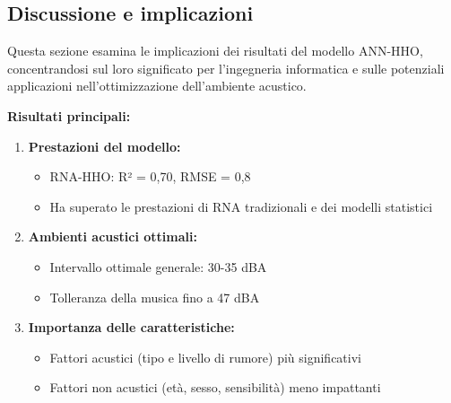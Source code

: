 \subsection{Discussione e implicazioni}
\noindent

Questa sezione esamina le implicazioni dei risultati del modello ANN-HHO, concentrandosi sul loro significato per l'ingegneria informatica e sulle potenziali applicazioni nell'ottimizzazione dell'ambiente acustico.

\textbf{Risultati principali:}
\begin{enumerate}
    \item \textbf{Prestazioni del modello:} 
    \begin{itemize}
        \item RNA-HHO: R² = 0,70, RMSE = 0,8
        \item Ha superato le prestazioni di RNA tradizionali e dei modelli statistici
    \end{itemize}
    \item \textbf{Ambienti acustici ottimali:} 
    \begin{itemize}
        \item Intervallo ottimale generale: 30-35 dBA
        \item Tolleranza della musica fino a 47 dBA
    \end{itemize}
    \item \textbf{Importanza delle caratteristiche:} 
    \begin{itemize}
        \item Fattori acustici (tipo e livello di rumore) più significativi
        \item Fattori non acustici (età, sesso, sensibilità) meno impattanti
    \end{itemize}
\end{enumerate}

